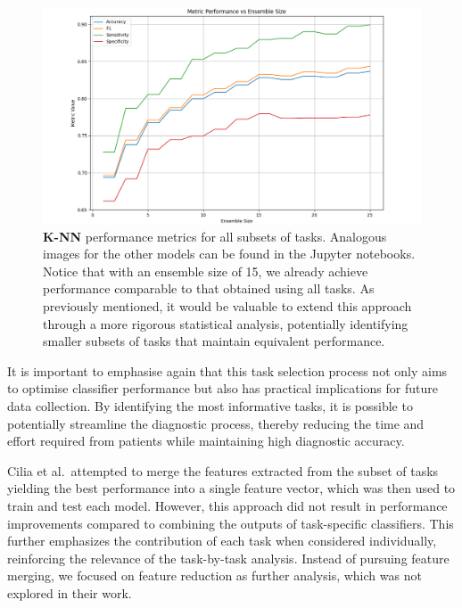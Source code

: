 \documentclass[a4paper, 11pt]{article}
\begin{document}
\begin{figure}[h!]
    \centering
    \includegraphics[width=\textwidth]{Figures/knn.png}
    \caption{\footnotesize{\textbf{K-NN} performance metrics for all subsets of tasks. Analogous images for the other models can be found in the Jupyter notebooks. Notice that with an ensemble size of 15, we already achieve performance comparable to that obtained using all tasks. As previously mentioned, it would be valuable to extend this approach through a more rigorous statistical analysis, potentially identifying smaller subsets of tasks that maintain equivalent performance.}}
    \label{fig:knn}
\end{figure}


It is important to emphasise again that this task selection process not only aims to optimise classifier performance but also has practical implications for future data collection. By identifying the most informative tasks, it is possible to potentially streamline the diagnostic process, thereby reducing the time and effort required from patients while maintaining high diagnostic accuracy. 

Cilia et al.~attempted to merge the features extracted from the subset of tasks yielding the best performance into a single feature vector, which was then used to train and test each model. However, this approach did not result in performance improvements compared to combining the outputs of task-specific classifiers. This further emphasizes the contribution of each task when considered individually, reinforcing the relevance of the task-by-task analysis. Instead of pursuing feature merging, we focused on feature reduction as further analysis, which was not explored in their work.
\end{document}
